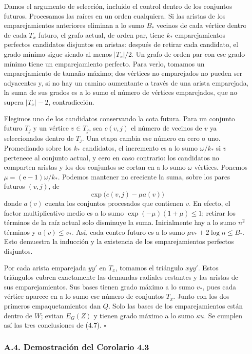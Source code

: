 \documentclass[spanish,11pt,a4paper]{article}
\begin{document}
Damos el argumento de selección, incluido el control dentro de los conjuntos futuros. Procesamos las raíces en un orden cualquiera. Si las aristas de los emparejamientos anteriores eliminan a lo sumo \(B_*\) vecinos de cada vértice dentro de cada \(T_x\) futuro, el grafo actual, de orden par, tiene \(k_*\) emparejamientos perfectos candidatos disjuntos en aristas: después de retirar cada candidato, el grado mínimo sigue siendo al menos \(|T_x|/2\). Un grafo de orden par con ese grado mínimo tiene un emparejamiento perfecto. Para verlo, tomamos un emparejamiento de tamaño máximo; dos vértices no emparejados no pueden ser adyacentes y, si no hay un camino aumentante a través de una arista emparejada, la suma de sus grados es a lo sumo el número de vértices emparejados, que no supera \(|T_x|-2\), contradicción.

Elegimos uno de los candidatos conservando la cota futura. Para un conjunto futuro \(T_j\) y un vértice \(v\in T_j\), sea \(c(v,j)\) el número de vecinos de \(v\) ya seleccionados dentro de \(T_j\). Una etapa cambia ese número en cero o uno. Promediando sobre los \(k_*\) candidatos, el incremento es a lo sumo \(\omega/k_*\) si \(v\) pertenece al conjunto actual, y cero en caso contrario: los candidatos no comparten aristas y los dos conjuntos se cortan en a lo sumo \(\omega\) vértices. Ponemos \(\mu=(\mathrm e-1)\omega/k_*\). Podemos mantener no creciente la suma, sobre los pares futuros \((v,j)\), de \[\exp\bigl(c(v,j)-\mu a(v)\bigr)\] donde \(a(v)\) cuenta los conjuntos procesados que contienen \(v\). En efecto, el factor multiplicativo medio es a lo sumo \(\exp(-\mu)(1+\mu)\le1\); retirar los términos de la raíz actual solo disminuye la suma. Inicialmente hay a lo sumo \(n^2\) términos y \(a(v)\le v_*\). Así, cada conteo futuro es a lo sumo \(\mu v_*+2\log n\le B_*\). Esto demuestra la inducción y la existencia de los emparejamientos perfectos disjuntos.

Por cada arista emparejada \(yy'\) en \(T_x\), tomamos el triángulo \(xyy'\). Estos triángulos cubren exactamente las demandas radiales restantes y las aristas de sus emparejamientos. Sus bases tienen grado máximo a lo sumo \(v_*\), pues cada vértice aparece en a lo sumo ese número de conjuntos \(T_x\). Junto con los dos primeros empaquetamientos dan \(Q\). Solo las bases de los emparejamientos están dentro de \(W\); evitan \(E_G(Z)\) y tienen grado máximo a lo sumo \(\kappa u\). Se cumplen así las tres conclusiones de (4.7). \(\square\)

\subsubsection{A.4. Demostración del Corolario 4.3}\label{a.4.-demostraciuxf3n-del-corolario-4.3}
\end{document}
